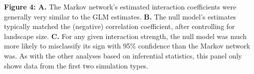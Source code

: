 \documentclass[12pt,]{article}
\begin{document}
\begin{spacing}{1.9}
\begin{flushleft}
\textbf{Figure 4: A.} The Markov network's estimated interaction
coefficients were generally very similar to the GLM estimates.
\textbf{B.} The null model's estimates typically matched the (negative)
correlation coefficient, after controlling for landscape size.
\textbf{C.} For any given interaction strength, the null model was much
more likely to misclassify its sign with 95\% confidence than the Markov
network was. As with the other analyses based on inferential statistics,
this panel only shows data from the first two simulation types.


\end{flushleft}
\end{spacing}
\end{document}
